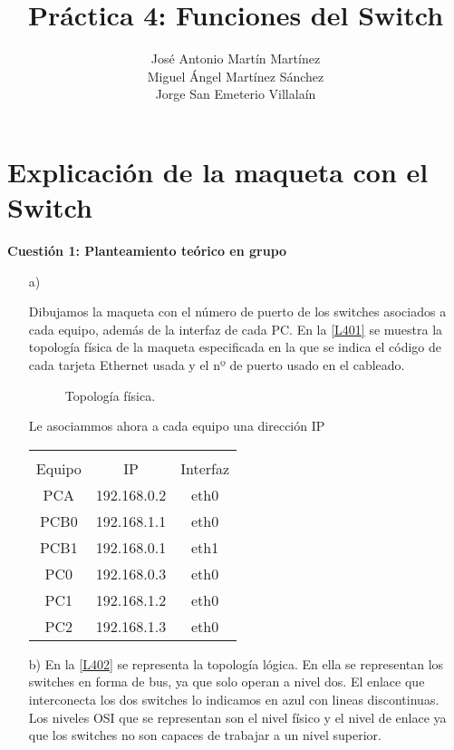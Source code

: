 \documentclass[a4paper,12pt,twoside]{article}
\begin{document}
\marginsize{2cm}{2.5cm}{0.4cm}{1cm} 
\title{\bf \color{NavyBlue}Práctica 4: Funciones del Switch}
\author{José Antonio Martín Martínez\\ Miguel Ángel Martínez Sánchez\\ Jorge San Emeterio Villalaín}
\date{}
\maketitle
\section{Explicación de la maqueta con el Switch}
{\bf Cuestión 1: Planteamiento teórico en grupo}\\
\begin{itemize}
\item[a)]

Dibujamos la maqueta con el número de puerto de los switches asociados a cada equipo, además de la interfaz de cada PC.
En la \autoref{L401} se muestra la topología física de la maqueta especificada en la que se indica el código de cada tarjeta Ethernet usada y el nº de puerto usado en el cableado.
\begin{figure}[h!]
\centering
\caption{Topología física.}\label{L401}
\end{figure}

Le asociammos ahora a cada equipo una dirección IP\\

\begin{minipage}[h!]{0.5\linewidth}
\centering
\begin{tabular}{c c c} 
\rowcolor{SkyBlue}\multicolumn{3}{c}{\textbf{IP equipos}}\\
\rowcolor{SkyBlue}Equipo & IP & Interfaz\\\hline
PCA & 192.168.0.2 & eth0\\
PCB0 & 192.168.1.1 & eth0\\
PCB1 & 192.168.0.1 & eth1\\
PC0 & 192.168.0.3 & eth0\\
PC1 & 192.168.1.2 & eth0\\
PC2 & 192.168.1.3 & eth0\\\hline

\end{tabular}
\end{minipage}

\item[b)] En la \autoref{L402} se representa la topología lógica. En ella se representan los switches en forma de bus, ya que solo operan a nivel dos. El enlace que interconecta los dos switches lo indicamos en azul con lineas discontinuas.\\
Los niveles OSI que se representan son el nivel físico y el nivel de enlace ya que los switches no son capaces de trabajar a un nivel superior.


\end{itemize}
\end{document}
